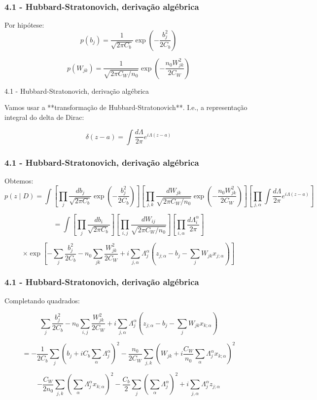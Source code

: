 \documentclass{beamer}
\begin{document}
\begin{frame}
    \frametitle{4.1 - Hubbard-Stratonovich, derivação algébrica}

    Por hipótese:
    $$
    p(b_j) = \frac{1}{\sqrt{2\pi C_b}} \exp(-\frac{b_j^2}{2C_b})
    $$

    $$
    p(W_{jk}) = \frac{1}{\sqrt{2\pi C_W/n_0}} \exp(-\frac{n_0 W_{jk}^2}{2C_W})
    $$

\end{frame}

\begin{frame}{4.1 - Hubbard-Stratonovich, derivação algébrica}

    Vamos usar a **transformação de Hubbard-Stratonovich**. I.e., a representação integral do delta de Dirac:

    $$
    \delta(z-a) = \int \frac{d\Lambda}{2\pi}e^{i\Lambda (z-a)}
    $$

\end{frame}

\begin{frame}
    \frametitle{4.1 - Hubbard-Stratonovich, derivação algébrica}

    Obtemos:
    \tiny
    $$
    p(z \mid D) = \int \left[ \prod_j \frac{db_j}{\sqrt{2\pi C_b}} \exp(-\frac{b_j^2}{2C_b}) \right] 
    \left[ \prod_{j,k} \frac{dW_{jk}}{\sqrt{2\pi C_W/n_0}} \exp(-\frac{n_0 W_{jk}^2}{2C_W}) \right] 
    \left[\prod_{j,\alpha}  \int \frac{d\Lambda}{2\pi}e^{i\Lambda (z-a)} \right]
    $$

    \pause

    $$
    = \int \left[ \prod_j \frac{db_i}{\sqrt{2\pi C_b}} \right]
    \left[ \prod_{i,j} \frac{dW_{ij}}{\sqrt{2\pi C_W / n_0}} \right]
    \left[ \prod_{i,\alpha} \frac{d\Lambda_{i}^{\alpha}}{2\pi} \right]
    $$

    $$
    \times \exp \left[
    - \sum_j \frac{b_j^2}{2C_b}
    - n_0 \sum_{jk} \frac{W_{jk}^2}{2C_W}
    + i \sum_{j,\alpha} \Lambda_{j}^{\alpha} 
    \left( z_{j;\alpha} - b_j - \sum_j W_{jk} x_{j;\alpha} \right)
    \right] 
    $$

\end{frame}

\begin{frame}
    \frametitle{4.1 - Hubbard-Stratonovich, derivação algébrica}

    Completando quadrados:

    $$
    \sum_j \frac{b_j^2}{2C_b}
    - n_0 \sum_{i,j} \frac{W_{jk}^2}{2C_W}
    + i \sum_{j,\alpha} \Lambda_{j}^{\alpha} 
    \left( z_{j;\alpha} - b_j - \sum_j W_{jk} x_{k;\alpha} \right)
    $$

    $$
    = -\frac{1}{2C_b} \sum_j \left( b_j + i C_b \sum_\alpha \Lambda_{j}^{\alpha} \right)^2
    - \frac{n_0}{2C_W} \sum_{j,k} \left( W_{jk} + i \frac{C_W}{n_0} \sum_\alpha \Lambda_{j}^{\alpha} x_{k;\alpha} \right)^2 
    $$

    $$
    - \frac{C_W}{2n_0} \sum_{j,k} \left( \sum_\alpha \Lambda_{j}^{\alpha} x_{k;\alpha} \right)^2
    - \frac{C_b}{2} \sum_j \left( \sum_\alpha \Lambda_{j}^{\alpha} \right)^2
    + i \sum_{j,\alpha} \Lambda_{j}^{\alpha} z_{j;\alpha} 
    $$

\end{frame}
\end{document}
